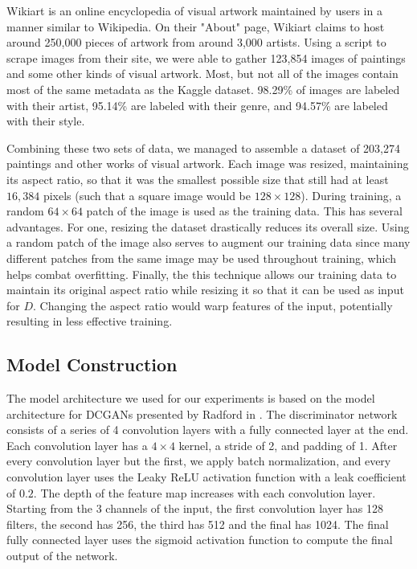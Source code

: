 \documentclass[10pt,twocolumn,letterpaper]{article}
\begin{document}
Wikiart is an online encyclopedia of visual artwork maintained by users in a manner similar to Wikipedia. On their "About" page, Wikiart claims to host around 250,000 pieces of artwork from around 3,000 artists. Using a script to scrape images from their site, we were able to gather 123,854 images of paintings and some other kinds of visual artwork. Most, but not all of the images contain most of the same metadata as the Kaggle dataset. 98.29\% of images are labeled with their artist, 95.14\% are labeled with their genre, and 94.57\% are labeled with their style.

Combining these two sets of data, we managed to assemble a dataset of 203,274 paintings and other works of visual artwork. Each image was resized, maintaining its aspect ratio, so that it was the smallest possible size that still had at least $ 16,384 $ pixels (such that a square image would be $ 128 \times 128 $). During training, a random $ 64 \times 64 $ patch of the image is used as the training data. This has several advantages. For one, resizing the dataset drastically reduces its overall size. Using a random patch of the image also serves to augment our training data since many different patches from the same image may be used throughout training, which helps combat overfitting. Finally, the this technique allows our training data to maintain its original aspect ratio while resizing it so that it can be used as input for $ D $. Changing the aspect ratio would warp features of the input, potentially resulting in less effective training.

\subsection{Model Construction}
The model architecture we used for our experiments is based on the model architecture for DCGANs presented by Radford \etal in \cite{radford2015unsupervised}. The discriminator network consists of a series of 4 convolution layers with a fully connected layer at the end. Each convolution layer has a $ 4 \times 4 $ kernel, a stride of 2, and padding of 1. After every convolution layer but the first, we apply batch normalization, and every convolution layer uses the Leaky ReLU activation function \cite{maas2013rectifier} with a leak coefficient of $ 0.2 $. The depth of the feature map increases with each convolution layer. Starting from the 3 channels of the input, the first convolution layer has 128 filters, the second has 256, the third has 512 and the final has 1024. The final fully connected layer uses the sigmoid activation function to compute the final output of the network.
\end{document}
